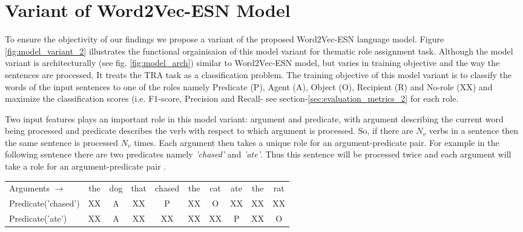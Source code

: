 \section{Variant of Word2Vec-ESN Model }\label{sec:model_variant}

To ensure the objectivity of our findings we propose a variant of the proposed Word2Vec-ESN language model. Figure \ref{fig:model_variant_2} illustrates the functional orgainisaion of this model variant for thematic role assignment task. Although the model variant is architecturally (see fig. \ref{fig:model_arch}) similar to Word2Vec-ESN model, but varies in training objective and the way the sentences are processed. It treats the TRA task as a classification problem. The training objective of this model variant is to classify the words of the input sentences to one of the roles namely Predicate (P), Agent (A), Object (O), Recipient (R) and No-role (XX) and maximize the classification scores (i.e. F1-score, Precision and Recall- see section-\ref{sec:evaluation_metrics_2} for each role.

Two input features plays an important role in this model variant: argument and predicate, with argument describing the current word being processed and predicate describes the verb with respect to which argument is processed. So, if there are $N_{v}$ verbs in a sentence then the same sentence is processed $N_{v}$ times. Each argument then takes a unique role for an argument-predicate pair. For example in the following sentence there are two predicates namely \textit{'chased'} and \textit{'ate'}. Thus this sentence will be processed twice and each argument will take a role for an argument-predicate pair \cite{end-to-end}.

\begin{table}[!htb]
\centering
\label{tab:argument-predicate}
\begin{tabular}{lccccccccc}
Arguments $\rightarrow$ & the & dog & that & chased & the & cat & ate & the & rat \\
Predicate('chased') 	 & XX  & A   & XX   & P      & XX  & O   & XX  & XX  & XX  \\
Predicate('ate')    	 & XX  & A   & XX   & XX     & XX  & XX  & P   & XX  & O  
\end{tabular}
\end{table}

